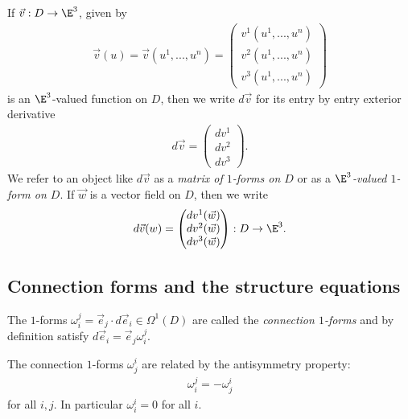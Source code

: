\documentclass{article}
\begin{document}
\begin{definition}
    If $\vec v:D\to\E^3$, given by 
    \begin{align*}
        \vec v(u)=\vec v(u^1,...,u^n)=\begin{pmatrix}
            v^1(u^1,...,u^n)\\ 
            v^2(u^1,...,u^n)\\
            v^3(u^1,...,u^n)
        \end{pmatrix}
    \end{align*}
    is an $\E^3$-valued function on $D$, then we write $d\vec v$ for its entry
    by entry exterior derivative 
    \begin{align*}
        d\vec v = \begin{pmatrix}
            dv^1 \\ dv^2 \\ dv^3
        \end{pmatrix}.
    \end{align*}
    We refer to an object like $d\vec v$ as a \emph{matrix of $1$-forms on $D$} or as a 
    \emph{$\E^3$-valued $1$-form on $D$}. If $\vec w$ is a vector field on $D$, then we write
    \begin{align*}
        d\vec v(w) = \begin{pmatrix}
            dv^1(\vec w) \\ dv^2(\vec w) \\ dv^3(\vec w)
        \end{pmatrix} : D\to\E^3.
    \end{align*}
\end{definition}

\subsection{Connection forms and the structure equations}

\begin{definition}
    The $1$-forms $\omega_i^j=\vec e_j\cdot d\vec e_i\in\Omega^1(D)$ are called the 
    \emph{connection $1$-forms} and by definition satisfy $d\vec e_i = \vec e_j\omega_i^j$.
\end{definition}

\begin{proposition}
    The connection $1$-forms $\omega_j^i$ are related by the antisymmetry property: 
    \begin{align*}
        \omega_i^j = -\omega_j^i
    \end{align*}
    for all $i,j$. In particular $\omega_i^i = 0$ for all $i$.
\end{proposition}
\end{document}
